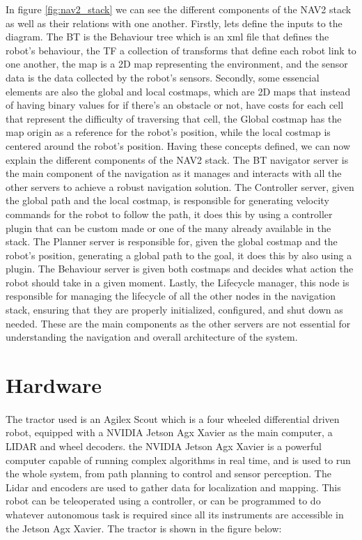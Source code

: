 In figure \ref{fig:nav2_stack} we can see the different components of the \gls{NAV2} stack as well as their 
relations with one another. Firstly, lets define the inputs to the diagram. The BT is the Behaviour tree 
which is an xml file that defines the robot's behaviour, the TF a collection of transforms that define each 
robot link to one another, the map is a 2D map representing the environment, and the sensor data is 
the data collected by the robot's sensors. Secondly, some essencial elements are also the global and local 
costmaps, which are 2D maps that instead of having binary values for if there's an obstacle or not, have 
costs for each cell that represent the difficulty of traversing that cell, the Global costmap 
has the map origin as a reference for the robot's position, while the local costmap is centered around 
the robot's position. Having these concepts defined, we can now explain the different components of 
the \gls{NAV2} stack. The BT navigator server is the main component of the navigation as it manages 
and interacts with all the other servers to achieve a robust navigation solution. The Controller server, 
given the global path and the local costmap, is responsible for generating velocity commands 
for the robot to follow the path, it does this by using a controller plugin that can be custom made or 
one of the many already available in the stack. The Planner server is responsible for, given the 
global costmap and the robot's position, generating a global path to the goal, it does this by also 
using a plugin. The Behaviour server is given both costmaps and decides what action the robot should take 
in a given moment. Lastly, the Lifecycle manager, this node is responsible for managing the lifecycle of all 
the other nodes in the navigation stack, ensuring that they are properly initialized, configured, and shut 
down as needed. These are the main components as the other servers are not essential for understanding 
the navigation and overall architecture of the system.

\section{Hardware}
\label{sec:hardware}

\paragraph{}The tractor used is an Agilex Scout which is a four wheeled differential driven robot, 
equipped with a NVIDIA Jetson Agx Xavier as the main computer, a LIDAR and wheel decoders. 
the NVIDIA Jetson Agx Xavier is a powerful computer capable of running complex algorithms in real time, 
and is used to run the whole system, from path planning to control and sensor 
perception. The Lidar and encoders are used to gather data for localization and mapping. This 
robot can be teleoperated using a controller, or can be programmed 
to do whatever autonomous task is required since all its instruments 
are accessible in the Jetson Agx Xavier. The tractor is shown in the figure below:


